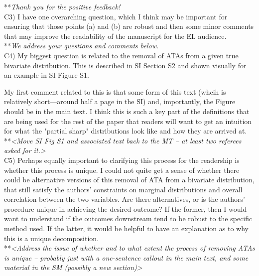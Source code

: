 \documentclass[letterpaper,11pt]{article}
\begin{document}
\noindent ***\emph{Thank you for the positive feedback!} \\

\noindent C3) I have one overarching question, which I think may be important for ensuring that those points (a) and (b) are robust and then some minor comments that may improve the readability of the manuscript for the EL audience. \\

\noindent ***\emph{We address your questions and comments below.} \\

\noindent C4) My biggest question is related to the removal of ATAs from a given true bivariate distribution.  This is described in SI Section S2 and shown visually for an example in SI Figure S1. 

My first comment related to this is that some form of this text (whcih is relatively short---around half a page in the SI) and, importantly, the Figure should be in the main text.  I think this is such a key part of the definitions that are being used for the rest of the paper that readers will want to get an intuition for what the "partial sharp" distributions look like and how they are arrived at. \\

\noindent ***\emph{<Move SI Fig S1 and associated text back to the MT – at least two referees asked for it.>} \\

\noindent C5) Perhaps equally important to clarifying this process for the readership is whether this process is unique. I could not quite get a sense of whether there could be alternative versions of this removal of ATA from a bivariate distribution, that still satisfy the authors' constraints on marginal distributions and overall correlation between the two variables. Are there alternatives, or is the authors' procedure unique in achieving the desired outcome?  If the former, then I would want to understand if the outcomes downstream tend to be robust to the specific method used. If the latter, it would be helpful to have an explanation as to why this is a unique decomposition. \\

\noindent ***\emph{<Address the issue of whether and to what extent the process of removing ATAs is unique – probably just with a one-sentence callout in the main text, and some material in the SM (possibly a new section)>} \\
\end{document}

